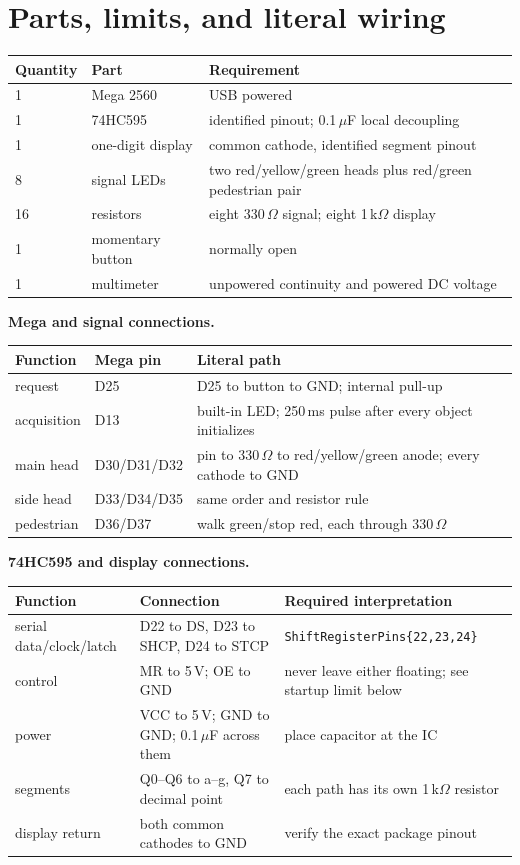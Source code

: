 \documentclass[11pt]{article}
\begin{document}
\section{Parts, limits, and literal wiring}

\begin{tabularx}{\linewidth}{@{}l l X@{}}
\toprule
Quantity & Part & Requirement\\
\midrule
1 & Mega 2560 & USB powered\\
1 & 74HC595 & identified pinout; 0.1\,\(\mu\)F local decoupling\\
1 & one-digit display & common cathode, identified segment pinout\\
8 & signal LEDs & two red/yellow/green heads plus red/green pedestrian pair\\
16 & resistors & eight 330\,\(\Omega\) signal; eight 1\,k\(\Omega\) display\\
1 & momentary button & normally open\\
1 & multimeter & unpowered continuity and powered DC voltage\\
\bottomrule
\end{tabularx}

\textbf{Mega and signal connections.}

\begin{tabularx}{\linewidth}{@{}l l X@{}}
\toprule
Function & Mega pin & Literal path\\
\midrule
request & D25 & D25 to button to GND; internal pull-up\\
acquisition & D13 & built-in LED; 250\,ms pulse after every object initializes\\
main head & D30/D31/D32 & pin to 330\,\(\Omega\) to red/yellow/green anode;
                              every cathode to GND\\
side head & D33/D34/D35 & same order and resistor rule\\
pedestrian & D36/D37 & walk green/stop red, each through 330\,\(\Omega\)\\
\bottomrule
\end{tabularx}

\textbf{74HC595 and display connections.}

\begin{tabularx}{\linewidth}{@{}l l X@{}}
\toprule
Function & Connection & Required interpretation\\
\midrule
serial data/clock/latch & D22 to DS, D23 to SHCP, D24 to STCP &
  \texttt{ShiftRegisterPins\{22,23,24\}}\\
control & MR to 5\,V; OE to GND & never leave either floating; see startup limit below\\
power & VCC to 5\,V; GND to GND; 0.1\,\(\mu\)F across them &
  place capacitor at the IC\\
segments & Q0--Q6 to a--g, Q7 to decimal point &
  each path has its own 1\,k\(\Omega\) resistor\\
display return & both common cathodes to GND & verify the exact package pinout\\
\bottomrule
\end{tabularx}
\end{document}
